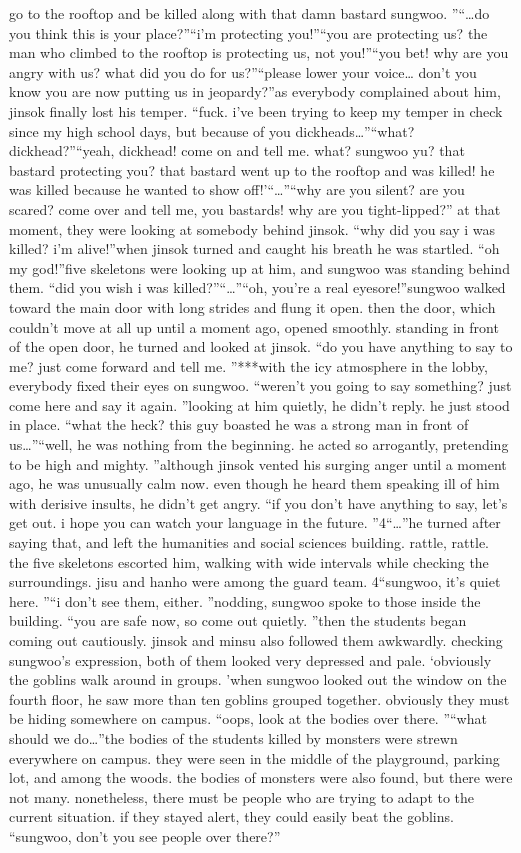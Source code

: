  go to the rooftop and be killed along with that damn bastard sungwoo.
”“…do you think this is your place?”“i’m protecting you!”“you are protecting us? the man who climbed to the rooftop is protecting us, not you!”“you bet! why are you angry with us? what did you do for us?”“please lower your voice… don’t you know you are now putting us in jeopardy?”as everybody complained about him, jinsok finally lost his temper.
“fuck.
 i’ve been trying to keep my temper in check since my high school days, but because of you dickheads…”“what? dickhead?”“yeah, dickhead! come on and tell me.
 what? sungwoo yu? that bastard protecting you? that bastard went up to the rooftop and was killed! he was killed because he wanted to show off!’“…”“why are you silent? are you scared? come over and tell me, you bastards! why are you tight-lipped?”
at that moment, they were looking at somebody behind jinsok.
“why did you say i was killed? i’m alive!”when jinsok turned and caught his breath he was startled.
“oh my god!”five skeletons were looking up at him, and sungwoo was standing behind them.
“did you wish i was killed?”“…”“oh, you’re a real eyesore!”sungwoo walked toward the main door with long strides and flung it open.
then the door, which couldn’t move at all up until a moment ago, opened smoothly.
standing in front of the open door, he turned and looked at jinsok.
“do you have anything to say to me? just come forward and tell me.
”***with the icy atmosphere in the lobby, everybody fixed their eyes on sungwoo.
“weren’t you going to say something? just come here and say it again.
”looking at him quietly, he didn’t reply.
 he just stood in place.
“what the heck? this guy boasted he was a strong man in front of us…”“well, he was nothing from the beginning.
 he acted so arrogantly, pretending to be high and mighty.
”although jinsok vented his surging anger until a moment ago, he was unusually calm now.
 even though he heard them speaking ill of him with derisive insults, he didn’t get angry.
“if you don’t have anything to say, let’s get out.
 i hope you can watch your language in the future.
”4“…”he turned after saying that, and left the humanities and social sciences building.
rattle, rattle.
the five skeletons escorted him, walking with wide intervals while checking the surroundings.
 jisu and hanho were among the guard team.
4“sungwoo, it’s quiet here.
”“i don’t see them, either.
”nodding, sungwoo spoke to those inside the building.
“you are safe now, so come out quietly.
”then the students began coming out cautiously.
 jinsok and minsu also followed them awkwardly.
 checking sungwoo’s expression, both of them looked very depressed and pale.
‘obviously the goblins walk around in groups.
’when sungwoo looked out the window on the fourth floor, he saw more than ten goblins grouped together.
 obviously they must be hiding somewhere on campus.
“oops, look at the bodies over there.
”“what should we do…”the bodies of the students killed by monsters were strewn everywhere on campus.
 they were seen in the middle of the playground, parking lot, and among the woods.
 the bodies of monsters were also found, but there were not many.
nonetheless, there must be people who are trying to adapt to the current situation.
 if they stayed alert, they could easily beat the goblins.
“sungwoo, don’t you see people over there?”

